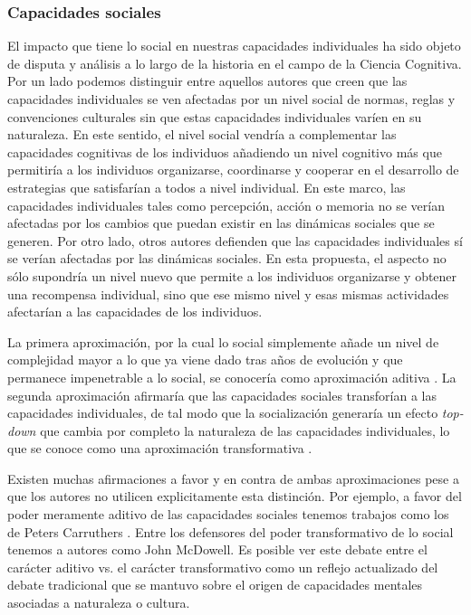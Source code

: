 \subsubsection{Capacidades sociales}
El impacto que tiene lo social en nuestras capacidades individuales ha sido objeto de disputa y análisis a lo largo de la historia en el campo de la Ciencia Cognitiva. Por un lado podemos distinguir entre aquellos autores que creen que las capacidades individuales se ven afectadas por un nivel social de normas, reglas y convenciones culturales sin que estas capacidades individuales varíen en su naturaleza. En este sentido, el nivel social vendría a complementar las capacidades cognitivas de los
individuos añadiendo un nivel cognitivo más que permitiría a los individuos organizarse, coordinarse y cooperar en el desarrollo de estrategias que satisfarían a todos a nivel individual. En este marco, las capacidades individuales tales como percepción, acción o memoria no se verían afectadas por los cambios que puedan existir en las dinámicas sociales que se generen. Por otro lado, otros autores defienden que las capacidades individuales sí se verían afectadas por las dinámicas sociales. En esta propuesta, el aspecto no sólo supondría un nivel nuevo que permite a los individuos organizarse y obtener una recompensa individual, sino que ese mismo nivel y esas mismas actividades afectarían a las capacidades de los individuos.

La primera aproximación, por la cual lo social simplemente añade un nivel de complejidad mayor a lo que ya viene dado tras años de evolución y que permanece impenetrable a lo social, se conocería como aproximación aditiva \cite{KernMoll}.
La segunda aproximación afirmaría que las capacidades sociales transforían a las capacidades individuales, de tal modo que la socialización generaría un efecto \textit{top-down} que cambia por completo la naturaleza de las capacidades individuales, lo que se conoce como una aproximación transformativa \cite{KernMoll}.

Existen muchas afirmaciones a favor y en contra de ambas aproximaciones pese a que los autores no utilicen explicitamente esta distinción. Por ejemplo, a favor del poder meramente aditivo de las capacidades sociales tenemos trabajos como los de Peters Carruthers \cite{Carruthers}. Entre los defensores del poder transformativo de lo social tenemos a autores como John McDowell\cite{McDowell}. Es posible ver este debate entre el carácter aditivo vs. el carácter transformativo como un reflejo actualizado del debate tradicional que se mantuvo sobre el origen de capacidades mentales asociadas a naturaleza o cultura.


